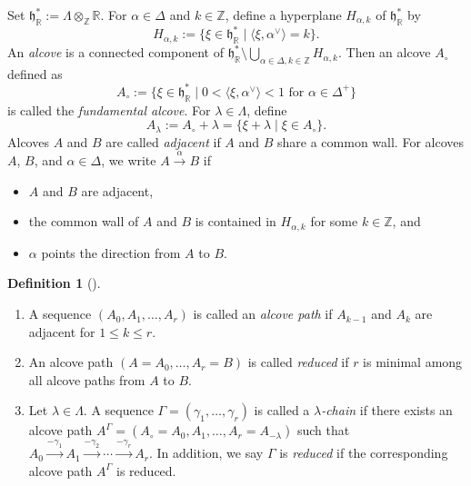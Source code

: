 \documentclass[a4paper, 11pt, reqno]{amsart}
\numberwithin{equation}{section}
\newcommand{\BZ}{\mathbb{Z}}
\newcommand{\BR}{\mathbb{R}}
\newcommand{\Fh}{\mathfrak{h}}
\newcommand{\pair}[2]{\langle #1, #2 \rangle}
\theoremstyle{plain}
\theoremstyle{definition}
\newtheorem{defn}[thm]{Definition}
\theoremstyle{remark}
\newenvironment{enu}{%
\begin{enumerate}[label=\textup{(\arabic*)}, left=0pt]}{%
\end{enumerate}}
\begin{document}
Set $\Fh_{\BR}^{\ast} := \Lambda \otimes_{\BZ} \BR$. For $\alpha \in \Delta$ and $k \in \BZ$, define a hyperplane $H_{\alpha, k}$ of $\Fh_{\BR}^{\ast}$ by 
\begin{equation}
H_{\alpha, k} := \{ \xi \in \Fh_{\BR}^{\ast} \mid \pair{\xi}{\alpha^{\vee}} = k \}. 
\end{equation}
An \emph{alcove} is a connected component of $\Fh_{\BR}^{\ast} \setminus \bigcup_{\alpha \in \Delta, k \in \BZ} H_{\alpha, k}$. Then an alcove $A_{\circ}$ defined as 
\begin{equation}
A_{\circ} := \{ \xi \in \Fh_{\BR}^{\ast} \mid \text{$0 < \pair{\xi}{\alpha^{\vee}} < 1$ for $\alpha \in \Delta^{+}$} \}
\end{equation}
is called the \emph{fundamental alcove}. 
For $\lambda \in \Lambda$, define 
\begin{equation}
A_{\lambda} := A_{\circ} + \lambda = \{ \xi + \lambda \mid \xi \in A_{\circ} \}. 
\end{equation} 
Alcoves $A$ and $B$ are called \emph{adjacent} if $A$ and $B$ share a common wall. 
For alcoves $A$, $B$, and $\alpha \in \Delta$, we write $A \xrightarrow{\alpha} B$ if
\begin{itemize}
\item $A$ and $B$ are adjacent, 
\item the common wall of $A$ and $B$ is contained in $H_{\alpha, k}$ for some $k \in \BZ$, and 
\item $\alpha$ points the direction from $A$ to $B$. 
\end{itemize}

\begin{defn}[{\cite[Definitions~5.2 and 5.4]{LP}}]
\begin{enu}
\item A sequence $(A_{0}, A_{1}, \ldots, A_{r})$ is called an \emph{alcove path} if $A_{k-1}$ and $A_{k}$ are adjacent for $1 \le k \le r$. 
\item An alcove path $(A = A_{0}, \ldots, A_{r} = B)$ is called \emph{reduced} if $r$ is minimal among all alcove paths from $A$ to $B$. 
\item Let $\lambda \in \Lambda$. A sequence $\Gamma = (\gamma_{1}, \ldots, \gamma_{r})$ is called a \emph{$\lambda$-chain} if there exists an alcove path $A^{\Gamma} = (A_{\circ} = A_{0}, A_{1}, \ldots, A_{r} = A_{-\lambda})$ such that $A_{0} \xrightarrow{-\gamma_{1}} A_{1} \xrightarrow{-\gamma_{2}} \cdots \xrightarrow{-\gamma_{r}} A_{r}$. In addition, we say $\Gamma$ is \emph{reduced} if the corresponding alcove path $A^{\Gamma}$ is reduced. 
\end{enu}
\end{defn}
\end{document}
